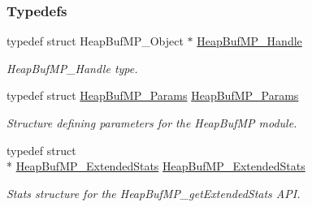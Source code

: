 \subsubsection*{Typedefs}
\begin{DoxyCompactItemize}
\item 
typedef struct Heap\-Buf\-M\-P\-\_\-\-Object $\ast$ \hyperlink{_heap_buf_m_p_8h_a0dc02cca2abd71fa48bfaf79c1c09ca3}{Heap\-Buf\-M\-P\-\_\-\-Handle}
\begin{DoxyCompactList}\small\item\em Heap\-Buf\-M\-P\-\_\-\-Handle type. \end{DoxyCompactList}\item 
typedef struct \hyperlink{struct_heap_buf_m_p___params}{Heap\-Buf\-M\-P\-\_\-\-Params} \hyperlink{_heap_buf_m_p_8h_ada60a6b6a4bee75403768e41d07525ff}{Heap\-Buf\-M\-P\-\_\-\-Params}
\begin{DoxyCompactList}\small\item\em Structure defining parameters for the Heap\-Buf\-M\-P module. \end{DoxyCompactList}\item 
typedef struct \\*
\hyperlink{struct_heap_buf_m_p___extended_stats}{Heap\-Buf\-M\-P\-\_\-\-Extended\-Stats} \hyperlink{_heap_buf_m_p_8h_a0a9972756cf113da0ac5f2eb7f647fbe}{Heap\-Buf\-M\-P\-\_\-\-Extended\-Stats}
\begin{DoxyCompactList}\small\item\em Stats structure for the Heap\-Buf\-M\-P\-\_\-get\-Extended\-Stats A\-P\-I. \end{DoxyCompactList}\end{DoxyCompactItemize}
